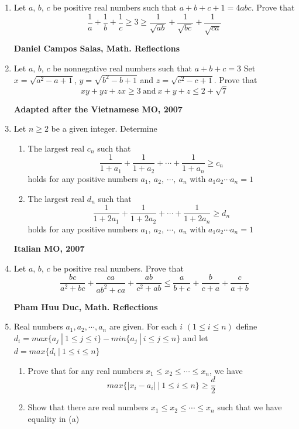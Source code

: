 \documentclass{article}
\begin{document}
\begin{enumerate}
\item Let $a$, $b$, $c$ be positive real numbers such that $a+b+c+1=4abc$. Prove that $$\frac{1}{a}+\frac{1}{b}+\frac{1}{c} \geq 3 \geq \frac{1}{\sqrt {ab}}+\frac{1}{\sqrt {bc}}+\frac{1}{\sqrt{ca}}$$
\begin {flushright}
\textbf{Daniel Campos Salas, Math. Reflections}
\end{flushright}
\item Let $a$, $b$, $c$ be nonnegative real numbers such that $a+b+c=3$ Set $x=\sqrt{a^2-a+1}$, $y=\sqrt{b^2-b+1}$ and $z=\sqrt{c^2-c+1}$. Prove that  $$xy+yz+zx\geq 3\ \text{and} \ x+y+z\leq 2+\sqrt{7}$$
\begin {flushright}
\textbf{Adapted after the Vietnamese MO, 2007}
\end{flushright}
\item Let $n\geq 2$ be a given integer. Determine 
\begin {enumerate}
\item The largest real $c_n $ such that  $$\frac {1}{1+a_1}+\frac {1}{1+a_2}+\cdots +\frac {1}{1+a_n} \geq c_n$$ holds for any positive numbers $a_1,\ a_2,\ \cdots,\ a_n$ with $a_1a_2\cdots a_n =1$
\item The largest real $d_n$ such that $$\frac {1}{1+2a_1}+\frac {1}{1+2a_2}+\cdots +\frac {1}{1+2a_n} \geq d_n$$ holds for any positive numbers $a_1,\ a_2,\ \cdots,\ a_n$ with $a_1a_2\cdots a_n =1$
\end {enumerate}
\begin {flushright}
\textbf{Italian MO, 2007}
\end{flushright}
\item Let $a$, $b$, $c$ be positive real numbers. Prove that $$\frac {bc}{a^2+bc}+\frac {ca}{ab^2+ca}+\frac {ab}{c^2+ab}\leq \frac {a}{b+c}+\frac {b}{c+a}+\frac {c}{a+b}$$
\begin {flushright}
\textbf{Pham Huu Duc, Math. Reflections}
\end{flushright}
\item Real numbers $a_1, a_2, \cdots, a_n$ are given. For each $i $ $(1\leq i \leq n)$ define $d_i=max\{a_j\ |\ 1\leq j \leq i \} -min\{a_j\ |\ i\leq j \leq n \}$ and let $d = max \{d_i\ |\ 1\leq i \leq n \}$
\begin {enumerate}
\item Prove that for any real numbers $x_1\leq x_2\leq \cdots \leq x_n$, we have $$max\{|x_i-a_i|\ |\ 1\leq i\leq n \}\geq \frac {d}{2}$$
\item Show that there are real numbers $x_1\leq x_2\leq \cdots \leq x_n$ such that we have equality in (a)

\end{enumerate}
\end{enumerate}
\end{document}
